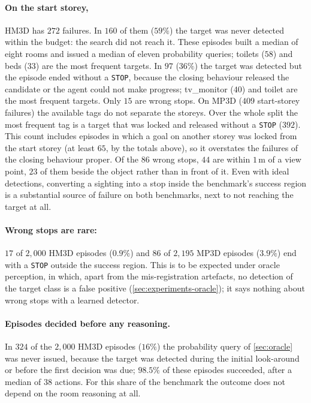 \documentclass[10pt]{article}
\newcommand{\code}[1]{\texttt{#1}}
\newcommand{\m}{\,\mathrm{m}}
\begin{document}
\paragraph{On the start storey,} HM3D has $272$ failures. In $160$ of them
($59\%$) the target was never detected within the budget: the search did not
reach it. These episodes built a median of eight rooms and issued a median of
eleven probability queries; toilets ($58$) and beds ($33$) are the most
frequent targets. In $97$ ($36\%$) the target was detected but the episode
ended without a \code{STOP}, because the closing behaviour released the
candidate or the agent could not make progress; tv\_monitor ($40$) and toilet
are the most frequent targets. Only $15$ are wrong stops. On MP3D ($409$
start-storey failures) the available tags do not separate the storeys. Over
the whole split the most frequent tag is a target that was locked and released
without a \code{STOP} ($392$). This count includes episodes in which a goal on
another storey was locked from the start storey (at least $65$, by the totals
above), so it overstates the failures of the closing behaviour proper. Of the
$86$ wrong stops, $44$ are within $1\m$ of a view point, $23$ of them beside
the object rather than in front of it. Even with ideal detections, converting
a sighting into a stop inside the benchmark's success region is a substantial
source of failure on both benchmarks, next to not reaching the target at all.

\paragraph{Wrong stops are rare:} $17$ of $2{,}000$ HM3D episodes ($0.9\%$)
and $86$ of $2{,}195$ MP3D episodes ($3.9\%$) end with a \code{STOP} outside
the success region. This is to be expected under oracle perception, in which,
apart from the mis-registration artefacts, no detection of the target class is
a false positive (\cref{sec:experiments-oracle}); it says nothing about wrong
stops with a learned detector.

\paragraph{Episodes decided before any reasoning.} In $324$ of the $2{,}000$
HM3D episodes ($16\%$) the probability query of \cref{sec:oracle} was never
issued, because the target was detected during the initial look-around or
before the first decision was due; $98.5\%$ of these episodes succeeded, after
a median of $38$ actions. For this share of the benchmark the outcome does not
depend on the room reasoning at all.
\end{document}
